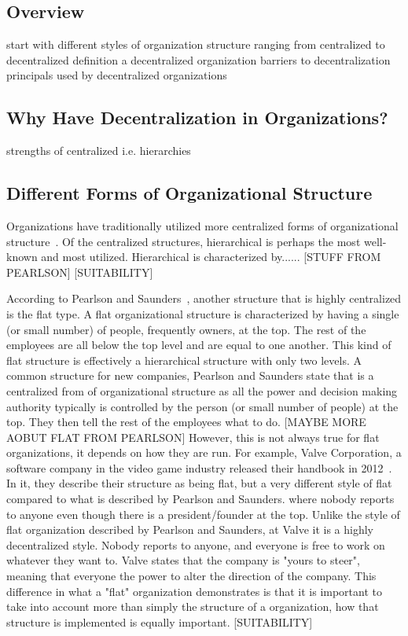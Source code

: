 \subsection{Overview}
start with different styles of organization structure ranging from centralized to decentralized
definition a decentralized organization
barriers to decentralization
principals used by decentralized organizations


\subsection{Why Have Decentralization in Organizations?}
strengths of centralized i.e. hierarchies

\subsection{Different Forms of Organizational Structure}
\label{org:form}

Organizations have traditionally utilized more centralized forms of organizational structure~\cite{pearlson2009}. Of the centralized structures,  hierarchical is perhaps the most well-known and most utilized. 
Hierarchical is characterized by...... [STUFF FROM PEARLSON] [SUITABILITY]

According to Pearlson and Saunders~\cite{pearlson2009}, another structure that is highly centralized is the flat type. A flat organizational structure is characterized by having a single (or small number) of people, frequently owners, at the top. The rest of the employees are all below the top level and are equal to one another. This kind of flat structure is effectively a hierarchical structure with only two levels. A common structure for new companies, Pearlson and Saunders state that is a centralized from of organizational structure as all the power and decision making authority typically is controlled by the person (or small number of people) at the top. They then tell the rest of the employees what to do. [MAYBE MORE AOBUT FLAT FROM PEARLSON] However, this is not always true for flat organizations, it depends on how they are run. For example, Valve Corporation, a software company in the video game industry released their handbook in 2012~\cite{valveHandbook}. In it, they describe their structure as being flat, but a very different style of flat compared to what is described by Pearlson and Saunders. where nobody reports to anyone even though there is a president/founder at the top. Unlike the style of flat organization described by Pearlson and Saunders, at Valve it is a highly decentralized style. Nobody reports to anyone, and everyone is free to work on whatever they want to. Valve states that the company is "yours to steer", meaning that everyone the power to alter the direction of the company. This difference in what a "flat" organization demonstrates is that it is important to take into account more than simply the structure of a organization, how that structure is implemented is equally important. 
[SUITABILITY]

